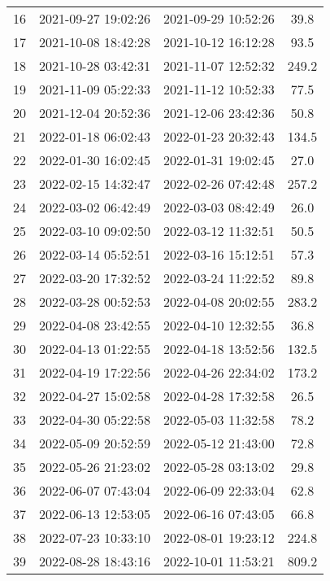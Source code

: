 \begin{center}
\begin{longtable}{|c|c|c|c|}
16 & 2021-09-27 19:02:26 & 2021-09-29 10:52:26 & 39.8\\ 
17 & 2021-10-08 18:42:28 & 2021-10-12 16:12:28 & 93.5\\ 
18 & 2021-10-28 03:42:31 & 2021-11-07 12:52:32 & 249.2\\ 
19 & 2021-11-09 05:22:33 & 2021-11-12 10:52:33 & 77.5\\ 
20 & 2021-12-04 20:52:36 & 2021-12-06 23:42:36 & 50.8\\ 
21 & 2022-01-18 06:02:43 & 2022-01-23 20:32:43 & 134.5\\ 
22 & 2022-01-30 16:02:45 & 2022-01-31 19:02:45 & 27.0\\ 
23 & 2022-02-15 14:32:47 & 2022-02-26 07:42:48 & 257.2\\ 
24 & 2022-03-02 06:42:49 & 2022-03-03 08:42:49 & 26.0\\ 
25 & 2022-03-10 09:02:50 & 2022-03-12 11:32:51 & 50.5\\ 
26 & 2022-03-14 05:52:51 & 2022-03-16 15:12:51 & 57.3\\ 
27 & 2022-03-20 17:32:52 & 2022-03-24 11:22:52 & 89.8\\ 
28 & 2022-03-28 00:52:53 & 2022-04-08 20:02:55 & 283.2\\ 
29 & 2022-04-08 23:42:55 & 2022-04-10 12:32:55 & 36.8\\ 
30 & 2022-04-13 01:22:55 & 2022-04-18 13:52:56 & 132.5\\ 
31 & 2022-04-19 17:22:56 & 2022-04-26 22:34:02 & 173.2\\ 
32 & 2022-04-27 15:02:58 & 2022-04-28 17:32:58 & 26.5\\ 
33 & 2022-04-30 05:22:58 & 2022-05-03 11:32:58 & 78.2\\ 
34 & 2022-05-09 20:52:59 & 2022-05-12 21:43:00 & 72.8\\ 
35 & 2022-05-26 21:23:02 & 2022-05-28 03:13:02 & 29.8\\ 
36 & 2022-06-07 07:43:04 & 2022-06-09 22:33:04 & 62.8\\ 
37 & 2022-06-13 12:53:05 & 2022-06-16 07:43:05 & 66.8\\ 
38 & 2022-07-23 10:33:10 & 2022-08-01 19:23:12 & 224.8\\ 
39 & 2022-08-28 18:43:16 & 2022-10-01 11:53:21 & 809.2\\ 
\hline
\end{longtable}
\end{center}

